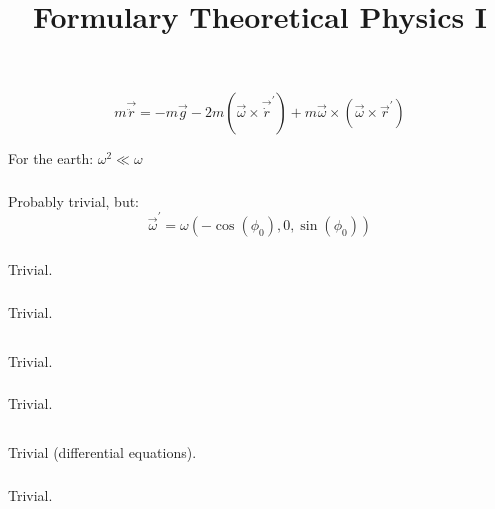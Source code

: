 \documentclass{report}
\title{Formulary Theoretical Physics I}
\begin{document}
\chapter{}

\section{}

\subsection{}
$$m\vec{\ddot{r}}=-m\vec{g}-2m(\vec{\omega}\times\vec{\dot{r}}^{'})+m\vec{\omega}\times(\vec{\omega}\times\vec{r}^{'})$$

For the earth: $\omega^2 \ll \omega$
\subsection{}
Probably trivial, but:
$$\vec{\omega}^{'}=\omega (-\cos(\phi_0),0,\sin(\phi_0))$$
\subsection{}
Trivial.
\subsection{}
Trivial.
\section{}

\subsection{}
Trivial.
\subsection{}
Trivial.
\section{}

\subsection{}
Trivial (differential equations).
\subsection{}
Trivial.
\end{document}
